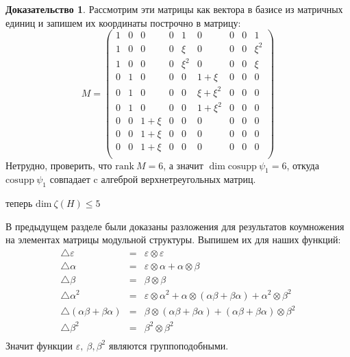 \documentclass[a4paper, 12pt]{article}
\theoremstyle{definition}
\newtheorem*{prof}{\hspace*{\parindent}Доказательство}
\begin{document}
\begin{prof}
    Рассмотрим эти матрицы как вектора в базисе из матричных единиц и запишем их координаты построчно в матрицу: \[ M=
    \begin{pmatrix}
        1 & 0 & 0 & 0 & 1 & 0 & 0 & 0 & 1\\
        1 & 0 & 0 & 0 & \xi & 0 & 0 & 0 & \xi^2\\
        1 & 0 & 0 & 0 & \xi^2 & 0 & 0 & 0 & \xi\\
        0 & 1 & 0 & 0 & 0 & 1+\xi & 0 & 0 & 0\\
        0 & 1 & 0 & 0 & 0 & \xi+\xi^2 & 0 & 0 & 0\\
        0 & 1 & 0 & 0 & 0 & 1+\xi^2 & 0 & 0 & 0\\
        0 & 0 & 1+\xi & 0 & 0 & 0 & 0 & 0 & 0\\
        0 & 0 & 1+\xi & 0 & 0 & 0 & 0 & 0 & 0\\
        0 & 0 & 1+\xi & 0 & 0 & 0 & 0 & 0 & 0\\
    \end{pmatrix}
    \]
    Нетрудно, проверить, что $\mathrm{rank}\ M = 6$, а значит $\dim \mathrm{cosupp} \ \psi_1 = 6$, откуда $\mathrm{cosupp}\ \psi_1$ совпадает c алгеброй верхнетреугольных матриц.
    
     теперь $\mathrm{dim}\ \zeta(H) \leq 5$\par

    В предыдущем разделе были доказаны разложения для результатов коумножения на элементах матрицы модульной структуры. Выпишем их для наших функций:
    \begin{eqnarray*}
        \bigtriangleup\varepsilon &=& \varepsilon \otimes \varepsilon\\
        \bigtriangleup\alpha &=& \varepsilon \otimes \alpha + \alpha \otimes \beta\\
        \bigtriangleup\beta &=& \beta \otimes \beta\\
        \bigtriangleup\alpha^2 &=& \varepsilon \otimes \alpha^2 + \alpha \otimes (\alpha\beta+\beta\alpha) + \alpha^2 \otimes \beta^2\\
        \bigtriangleup(\alpha\beta+\beta\alpha) &=& \beta \otimes (\alpha\beta+\beta\alpha) + (\alpha\beta+\beta\alpha)\otimes \beta^2\\
        \bigtriangleup\beta^2 &=& \beta^2 \otimes \beta^2\\
    \end{eqnarray*}
    Значит функции $\varepsilon,\ \beta, \beta^2$ являются группоподобными.
    

\end{prof}
\end{document}

